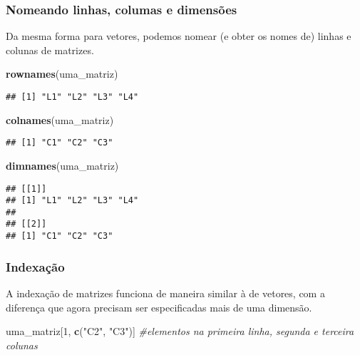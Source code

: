 \documentclass[]{book}
\newenvironment{Shaded}{\begin{snugshade}}{\end{snugshade}}
\newcommand{\CommentTok}[1]{\textcolor[rgb]{0.56,0.35,0.01}{\textit{#1}}}
\newcommand{\DecValTok}[1]{\textcolor[rgb]{0.00,0.00,0.81}{#1}}
\newcommand{\KeywordTok}[1]{\textcolor[rgb]{0.13,0.29,0.53}{\textbf{#1}}}
\newcommand{\NormalTok}[1]{#1}
\newcommand{\StringTok}[1]{\textcolor[rgb]{0.31,0.60,0.02}{#1}}
\theoremstyle{definition}
\theoremstyle{definition}
\theoremstyle{definition}
\theoremstyle{remark}
\begin{document}
\hypertarget{nomeando-linhas-columas-e-dimensuxf5es}{%
\subsubsection{Nomeando linhas, columas e dimensões}\label{nomeando-linhas-columas-e-dimensuxf5es}}

Da mesma forma para vetores, podemos nomear (e obter os nomes de) linhas e colunas de matrizes.

\begin{Shaded}
\begin{Highlighting}[]
\KeywordTok{rownames}\NormalTok{(uma_matriz)}
\end{Highlighting}
\end{Shaded}

\begin{verbatim}
## [1] "L1" "L2" "L3" "L4"
\end{verbatim}

\begin{Shaded}
\begin{Highlighting}[]
\KeywordTok{colnames}\NormalTok{(uma_matriz)}
\end{Highlighting}
\end{Shaded}

\begin{verbatim}
## [1] "C1" "C2" "C3"
\end{verbatim}

\begin{Shaded}
\begin{Highlighting}[]
\KeywordTok{dimnames}\NormalTok{(uma_matriz)}
\end{Highlighting}
\end{Shaded}

\begin{verbatim}
## [[1]]
## [1] "L1" "L2" "L3" "L4"
## 
## [[2]]
## [1] "C1" "C2" "C3"
\end{verbatim}

\hypertarget{indexauxe7uxe3o}{%
\subsubsection{Indexação}\label{indexauxe7uxe3o}}

A indexação de matrizes funciona de maneira similar à de vetores, com a diferença que agora precisam ser especificadas mais de uma dimensão.

\begin{Shaded}
\begin{Highlighting}[]
\NormalTok{uma_matriz[}\DecValTok{1}\NormalTok{, }\KeywordTok{c}\NormalTok{(}\StringTok{"C2"}\NormalTok{, }\StringTok{"C3"}\NormalTok{)] }\CommentTok{#elementos na primeira linha, segunda e terceira colunas}
\end{Highlighting}
\end{Shaded}
\end{document}
